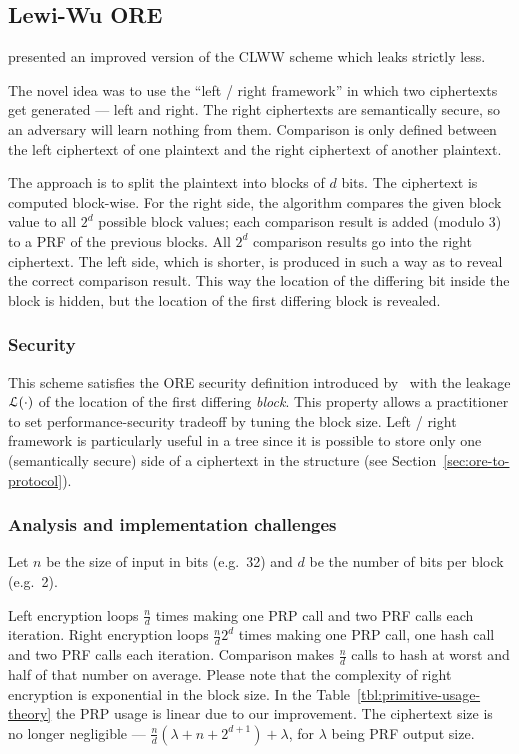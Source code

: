 \subsection{Lewi-Wu ORE}

	\textcite{lewi-wu-ore} presented an improved version of the CLWW scheme \cite{clww-ore} which leaks strictly less.

	The novel idea was to use the ``left / right framework'' in which two ciphertexts get generated --- left and right.
	The right ciphertexts are semantically secure, so an adversary will learn nothing from them.
	Comparison is only defined between the left ciphertext of one plaintext and the right ciphertext of another plaintext.

	The approach is to split the plaintext into blocks of $d$ bits.
	The ciphertext is computed block-wise.
	For the right side, the algorithm compares the given block value to all $2^d$ possible block values; each comparison result is added (modulo 3) to a PRF of the previous blocks.
	All $2^d$ comparison results go into the right ciphertext.
	The left side, which is shorter, is produced in such a way as to reveal the correct comparison result.
	This way the location of the differing bit inside the block is hidden, but the location of the first differing block is revealed.

	\subsubsection{Security}
		This scheme satisfies the ORE security definition introduced by~\textcite{clww-ore} with the leakage $\mathcal{L}(\cdot)$ of the location of the first differing \emph{block}.
		This property allows a practitioner to set performance-security tradeoff by tuning the block size.
		Left / right framework is particularly useful in a {\BPlus} tree since it is possible to store only one (semantically secure) side of a ciphertext in the structure (see Section~\ref{sec:ore-to-protocol}).

	\subsubsection{Analysis and implementation challenges}

		Let $n$ be the size of input in bits (e.g.\ 32) and $d$ be the number of bits per block (e.g.\ 2).

		Left encryption loops $\frac{n}{d}$ times making one PRP call and two PRF calls each iteration.
		Right encryption loops $\frac{n}{d} 2^d$ times making one PRP call, one hash call and two PRF calls each iteration.
		Comparison makes $\frac{n}{d}$ calls to hash at worst and half of that number on average.
		Please note that the complexity of right encryption is exponential in the block size.
		In the Table~\ref{tbl:primitive-usage-theory} the PRP usage is linear due to our improvement.
		The ciphertext size is no longer negligible --- $\frac{n}{d} \left(\lambda + n + 2^{d + 1} \right) + \lambda$, for $\lambda$ being PRF output size.

